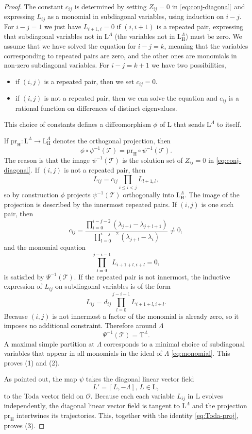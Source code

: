 \documentclass[reqno]{amsart}
\newcommand{\cO}{\mathcal{O}}
\newcommand{\cT}{\mathcal{T}}
\newcommand{\T}{\mathbb{T}}
\newcommand{\pr}{\mathrm{pr}}
\renewcommand{\L}{\mathrm{L}}
\renewcommand{\T}{\mathrm{T}}
\renewcommand{\H}{\mathrm{H}}
\begin{document}
\begin{proof}
The constant $c_{ij}$ is determined by setting $Z_{ij}=0$ in \eqref{eq:conj-diagonal} and expressing $L_{ij}$ as a monomial in subdiagonal variables, using induction on $i-j$.
For $i-j=1$ we just have $L_{i+1,i}=0$ if $(i,i+1)$ is a repeated pair, expressing that subdiagonal variables not in $\L^\Lambda$ (the variables not in $\L^\Lambda_\H$) must be zero. We assume that we have solved the equation  for $i-j=k$, meaning that the variables corresponding to repeated pairs are zero, and the other ones are monomials in non-zero subdiagonal variables.  For $i-j=k+1$ we have two possibilities,
\begin{itemize}
\item if $(i,j)$ is a repeated pair, then we set $c_{ij}=0$.
 \item if $(i,j)$ is not a repeated pair, then we can solve the equation and $c_{ij}$ is a rational function on differences of distinct eigenvalues.
\end{itemize}
This choice of constants defines a  diffeomorphism $\phi$ of $\L$ that sends $\L^\Lambda$ to itself.

If $\pr_\H:\L^\Lambda\to \L^\Lambda_\H$ denotes the orthogonal projection, then
\begin{equation}\label{eq:Toda-proj}\phi\circ \psi^{-1}(\cT)=\pr_\H\circ \psi^{-1}(\cT).
 \end{equation}
The reason is that the image $\psi^{-1}(\cT)$ is the solution set of $Z_{ij}=0$ in  \eqref{eq:conj-diagonal}. If $(i,j)$ is not a repeated pair, then
\[L_{ij}=c_{ij}\prod_{i\leq l< j}L_{l+1,l},\]
so by construction $\phi$ projects $\psi^{-1}(\cT)$ orthogonally into $\L^\Lambda_\H$.
The image of the projection is described by the innermost repeated pairs. If $(i,j)$ is one such pair, then
\[ c_{ij}=\frac{\prod_{l=0}^{i-j-2}(\lambda_{j+l}-\lambda_{j+l+1})}{\prod_{l=0}^{i-j-2}(\lambda_{j+l}-\lambda_i)}\neq 0,\]
and the monomial equation \[\prod_{l=0}^{j-i-1}L_{i+1+l,i+l}=0,\]
is satisfied by $\Psi^{-1}(\cT)$. If the repeated pair is not innermost, the inductive expression of $L_{ij}$ on subdiagonal variables is of the form
\[L_{ij}=d_{ij}\prod_{l=0}^{j-i-1}L_{i+1+l,i+l}.\]
Because $(i,j)$ is not innermost a factor of the monomial is already zero, so it imposes no additional constraint.  Therefore around $\Lambda$
\[\Psi^{-1}(\cT)=\T^\Lambda.\]
A maximal simple partition at $\Lambda$ corresponds to a minimal choice of subdiagonal variables that appear in all monomials in the ideal of $\Lambda$ \eqref{eq:monomial}. This proves (1) and (2).

As pointed out, the map $\psi$ takes the diagonal linear vector field
\[L'=[L,-\Lambda],\,L\in \L,\]
to the Toda vector field on $\cO$. Because each each variable $L_{ij}$ in $\L$ evolves independently, the diagonal linear vector field is tangent to $\L^\Lambda$ and the projection $\pr_\H$ intertwines its trajectories. This, together with the identity \eqref{eq:Toda-proj}, proves (3).
\end{proof}
\end{document}
